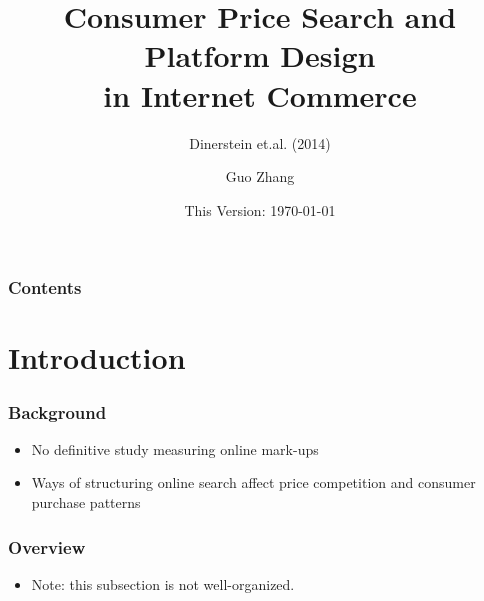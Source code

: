 \documentclass{beamer}
\title{Consumer Price Search and Platform Design\\ in Internet Commerce}
\subtitle{Dinerstein et.al. (2014)}
\author{Guo Zhang}
\institute[Universities of]
{
WISE, Xiamen University
}
\date{This Version: \today}
\begin{document}
\begin{frame}[plain]
\maketitle
\end{frame}

\begin{frame}[plain]
\frametitle{Contents}
\begin{multicols}{2}
\tableofcontents
\end{multicols}
\end{frame}

\section{Introduction}
\begin{frame}
\frametitle{Background}
\begin{itemize}
\item No definitive study measuring online mark-ups
\item Ways of structuring online search affect price competition and consumer purchase patterns
\end{itemize}
\end{frame}

\begin{frame}
\frametitle{Overview}
\begin{itemize}
\item Note: this subsection is not well-organized. 
\end{itemize}
\end{frame}
\end{document}
